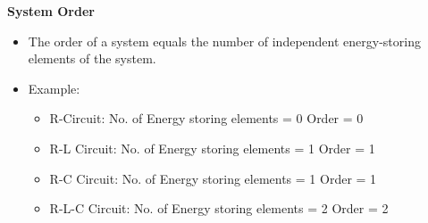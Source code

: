 \documentclass[../notes-main.tex]{subfiles}
\begin{document}
\textbf{System Order}
\begin{itemize}
    \item The order of a system equals the number of independent energy-storing elements of the system.
    \item Example:
    \begin{itemize}
        \item R-Circuit: No. of Energy storing elements = 0 Order = 0
        \item R-L Circuit: No. of Energy storing elements = 1 Order = 1
        \item R-C Circuit: No. of Energy storing elements = 1 Order = 1
        \item R-L-C Circuit: No. of Energy storing elements = 2 Order = 2
    \end{itemize}
\end{itemize}
\end{document}
